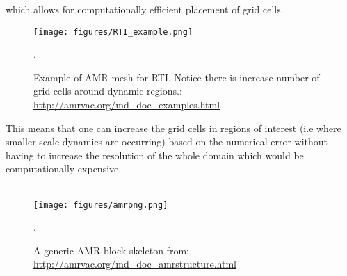 \documentclass[12pt]{ociamthesis}
\newcommand{\np}{\\ \\}
\begin{document}
which allows for computationally efficient placement of grid cells. 
\begin{figure}
\centering
\texttt{[image: figures/RTI\_example.png]}
\caption{Example of AMR mesh for RTI. Notice there is increase number of grid cells around dynamic regions.: \url{http://amrvac.org/md_doc_examples.html}}.
\label{amr_example}
\end{figure}   
This means that one can increase the grid cells in regions of interest (i.e where smaller scale dynamics are occurring) based on the numerical error without having to increase the resolution of the whole domain which would be computationally expensive. \np
\begin{figure}
\centering
\texttt{[image: figures/amrpng.png]}
\caption{A generic AMR block skeleton from: \url{http://amrvac.org/md_doc_amrstructure.html}}.
\label{amr_scheme}
\end{figure}   
\end{document}

